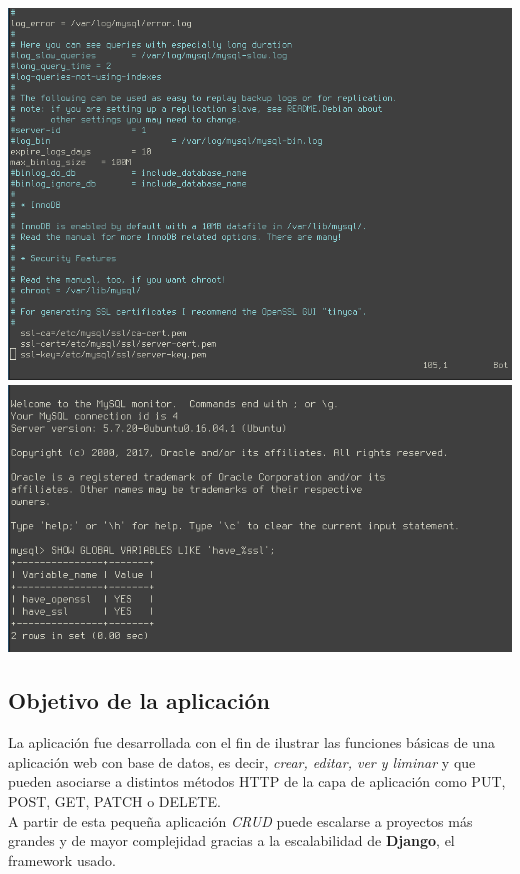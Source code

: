 \documentclass[9pt]{article}
\begin{document}
\includegraphics[width=\textwidth]{mysql_conf-ssl}
\includegraphics[width=\textwidth]{mysql_ssl-enabled}

\vspace{2cm} %

\subsection{Objetivo de la aplicación}
La aplicación fue desarrollada con el fin de ilustrar las funciones básicas de una aplicación web con base de datos, es decir, \textit{crear, editar, ver y liminar} y que pueden asociarse a distintos métodos \textsf{HTTP} de la capa de aplicación como \textsf{PUT, POST, GET, PATCH o DELETE}. \\
A partir de esta pequeña aplicación \textit{CRUD} puede escalarse a proyectos más grandes y de mayor complejidad gracias a la escalabilidad de \textbf{Django}, el framework usado.
\end{document}

